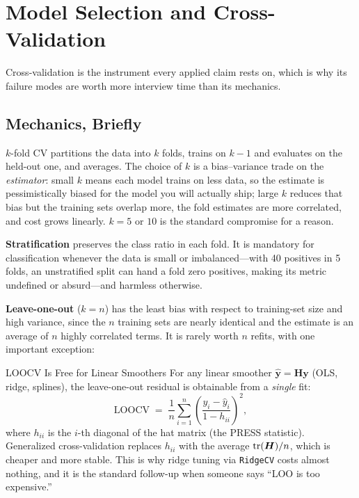 \section{Model Selection and Cross-Validation}
\label{cml:sec:cv}

Cross-validation is the instrument every applied claim rests on, which is why its failure modes are worth more interview time than its mechanics.

\subsection{Mechanics, Briefly}

$k$-fold CV partitions the data into $k$ folds, trains on $k-1$ and evaluates on the held-out one, and averages. The choice of $k$ is a bias--variance trade on the \emph{estimator}: small $k$ means each model trains on less data, so the estimate is pessimistically biased for the model you will actually ship; large $k$ reduces that bias but the training sets overlap more, the fold estimates are more correlated, and cost grows linearly. $k = 5$ or $10$ is the standard compromise for a reason.

\textbf{Stratification} preserves the class ratio in each fold. It is mandatory for classification whenever the data is small or imbalanced---with 40 positives in 5 folds, an unstratified split can hand a fold zero positives, making its metric undefined or absurd---and harmless otherwise.

\textbf{Leave-one-out} ($k=n$) has the least bias with respect to training-set size and high variance, since the $n$ training sets are nearly identical and the estimate is an average of $n$ highly correlated terms. It is rarely worth $n$ refits, with one important exception:

\begin{mathresult}{LOOCV Is Free for Linear Smoothers}
For any linear smoother $\hat{\bm y} = \bm H \bm y$ (OLS, ridge, splines), the leave-one-out residual is obtainable from a \emph{single} fit:
\begin{equation}
\text{LOOCV} \;=\; \frac{1}{n}\sum_{i=1}^n \left(\frac{y_i - \hat y_i}{1 - h_{ii}}\right)^{\!2},
\end{equation}
where $h_{ii}$ is the $i$-th diagonal of the hat matrix (the PRESS statistic). Generalized cross-validation replaces $h_{ii}$ with the average $\operatorname{tr}(\bm H)/n$, which is cheaper and more stable. This is why ridge tuning via \texttt{RidgeCV} costs almost nothing, and it is the standard follow-up when someone says ``LOO is too expensive.''
\end{mathresult}

